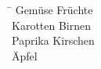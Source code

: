 \documentclass[varwidth]{standalone}
\begin{document}
\begin{tabbing}
\hspace{4cm}\=\kill
Gemüse \> Früchte\\ 
Karotten \> Birnen\\ 
Paprika \> Kirschen\\ 
 \> Äpfel
\end{tabbing}
\end{document}
